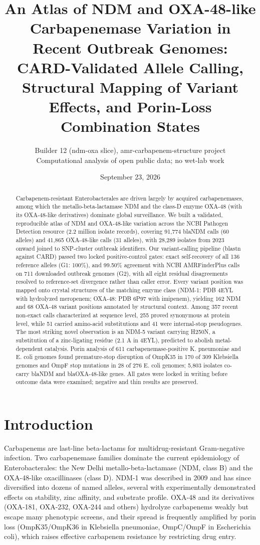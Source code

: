 \documentclass[11pt]{article}
\title{An Atlas of NDM and OXA-48-like Carbapenemase Variation in Recent Outbreak Genomes: CARD-Validated Allele Calling, Structural Mapping of Variant Effects, and Porin-Loss Combination States}
\author{Builder 12 (ndm-oxa slice), amr-carbapenem-structure project\\Computational analysis of open public data; no wet-lab work}
\date{September 23, 2026}
\begin{document}
\maketitle
\begin{abstract}
Carbapenem-resistant Enterobacterales are driven largely by acquired carbapenemases, among which the metallo-beta-lactamase NDM and the class-D enzyme OXA-48 (with its OXA-48-like derivatives) dominate global surveillance. We built a validated, reproducible atlas of NDM and OXA-48-like variation across the NCBI Pathogen Detection resource (2.2 million isolate records), covering 91,774 blaNDM calls (60 alleles) and 41,865 OXA-48-like calls (31 alleles), with 28,289 isolates from 2023 onward joined to SNP-cluster outbreak identifiers. Our variant-calling pipeline (blastn against CARD) passed two locked positive-control gates: exact self-recovery of all 136 reference alleles (G1: 100\%), and 99.50\% agreement with NCBI AMRFinderPlus calls on 711 downloaded outbreak genomes (G2), with all eight residual disagreements resolved to reference-set divergence rather than caller error. Every variant position was mapped onto crystal structures of the matching enzyme class (NDM-1: PDB 4EYL with hydrolyzed meropenem; OXA-48: PDB 6P97 with imipenem), yielding 162 NDM and 68 OXA-48 variant positions annotated by structural context. Among 357 recent non-exact calls characterized at sequence level, 255 proved synonymous at protein level, while 51 carried amino-acid substitutions and 41 were internal-stop pseudogenes. The most striking novel observation is an NDM-5 variant carrying H250N, a substitution of a zinc-ligating residue (2.1 A in 4EYL), predicted to abolish metal-dependent catalysis. Porin analysis of 611 carbapenemase-positive K. pneumoniae and E. coli genomes found premature-stop disruption of OmpK35 in 170 of 309 Klebsiella genomes and OmpF stop mutations in 28 of 276 E. coli genomes; 5,803 isolates co-carry blaNDM and blaOXA-48-like genes. All gates were locked in writing before outcome data were examined; negative and thin results are preserved.
\end{abstract}

\section{Introduction}
Carbapenems are last-line beta-lactams for multidrug-resistant Gram-negative infection. Two carbapenemase families dominate the current epidemiology of Enterobacterales: the New Delhi metallo-beta-lactamase (NDM, class B) and the OXA-48-like oxacillinases (class D). NDM-1 was described in 2009 and has since diversified into dozens of named alleles, several with experimentally demonstrated effects on stability, zinc affinity, and substrate profile. OXA-48 and its derivatives (OXA-181, OXA-232, OXA-244 and others) hydrolyze carbapenems weakly but escape many phenotypic screens, and their spread is frequently amplified by porin loss (OmpK35/OmpK36 in Klebsiella pneumoniae, OmpC/OmpF in Escherichia coli), which raises effective carbapenem resistance by restricting drug entry.
\end{document}
